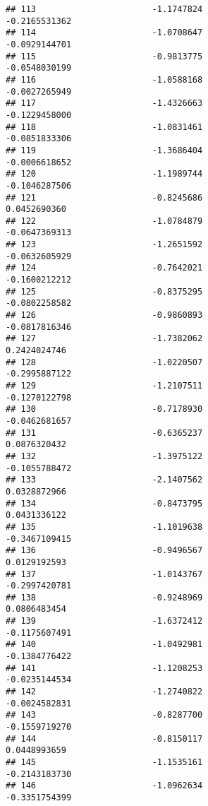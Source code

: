 \documentclass[
]{article}
\begin{document}
\begin{verbatim}
## 113                       -1.1747824                         -0.2165531362
## 114                       -1.0708647                         -0.0929144701
## 115                       -0.9813775                         -0.0548030199
## 116                       -1.0588168                         -0.0027265949
## 117                       -1.4326663                         -0.1229458000
## 118                       -1.0831461                         -0.0851833306
## 119                       -1.3686404                         -0.0006618652
## 120                       -1.1989744                         -0.1046287506
## 121                       -0.8245686                          0.0452690360
## 122                       -1.0784879                         -0.0647369313
## 123                       -1.2651592                         -0.0632605929
## 124                       -0.7642021                         -0.1600212212
## 125                       -0.8375295                         -0.0802258582
## 126                       -0.9860893                         -0.0817816346
## 127                       -1.7382062                          0.2424024746
## 128                       -1.0220507                         -0.2995887122
## 129                       -1.2107511                         -0.1270122798
## 130                       -0.7178930                         -0.0462681657
## 131                       -0.6365237                          0.0876320432
## 132                       -1.3975122                         -0.1055788472
## 133                       -2.1407562                          0.0328872966
## 134                       -0.8473795                          0.0431336122
## 135                       -1.1019638                         -0.3467109415
## 136                       -0.9496567                          0.0129192593
## 137                       -1.0143767                         -0.2997420781
## 138                       -0.9248969                          0.0806483454
## 139                       -1.6372412                         -0.1175607491
## 140                       -1.0492981                         -0.1384776422
## 141                       -1.1208253                         -0.0235144534
## 142                       -1.2740822                         -0.0024582831
## 143                       -0.8287700                         -0.1559719270
## 144                       -0.8150117                          0.0448993659
## 145                       -1.1535161                         -0.2143183730
## 146                       -1.0962634                         -0.3351754399

\end{verbatim}
\end{document}
